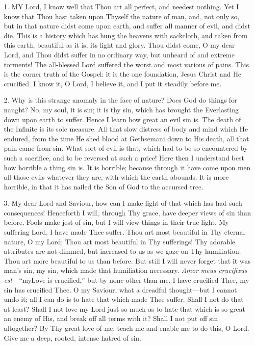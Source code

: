 
1. MY
Lord, I know well that Thou art all perfect, and needest nothing. Yet I
know that Thou hast taken upon Thyself the nature of man, and, not only
so, but in that nature didst come upon earth, and suffer all
manner of evil, and didst die. This is a history which has hung the
heavens with sackcloth, and taken from this earth, beautiful as it is,
its light and glory. Thou didst come, O my dear Lord, and Thou didst
suffer in no ordinary way, but unheard of and extreme torments! The
all-blessed Lord suffered the worst and most various of pains. This is
the corner truth of the Gospel: it is the one foundation, Jesus Christ
and He crucified. I know it, O Lord, I believe it, and I put it steadily
before me.

2. Why is this strange anomaly
in the face of nature? Does God do things for naught? No, my soul, it is
sin; it is thy sin, which has brought the Everlasting down upon earth to
suffer. Hence I learn how great an evil sin is. The death of the
Infinite is its sole measure. All that slow distress of body and mind
which He endured, from the time He shed blood at Gethsemani down to His
death, all that pain came from sin. What sort of evil is that, which had
to be so encountered by such a sacrifice, and to be reversed at such a
price! Here then I understand best how horrible a thing sin is. It is
horrible; because through it have come upon men all those evils whatever
they are, with which the earth abounds. It is more horrible, in that it
has nailed the Son of God to the accursed tree.

3. My dear Lord and Saviour, how
can I make light of that which has had such consequences! Henceforth I
will, through Thy grace, have deeper views of sin than before. Fools
make jest of sin, but I will view things in their true light. My
suffering Lord, I have made Thee suffer. Thou art most beautiful in Thy
eternal nature, O my Lord; Thou art most beautiful in Thy sufferings!
Thy adorable attributes are not dimmed, but increased to us as we gaze
on Thy humiliation. Thou art more beautiful to us than before. But still
I will never forget that it was man's sin, my sin, which made that
humiliation necessary. \emph{Amor meus crucifixus est}—``my\emph{}Love
is crucified,'' but by none other than me. I have crucified Thee, my sin
has crucified Thee. O my Saviour, what a dreadful thought—but I cannot
undo it; all I can do is to hate that which made Thee suffer. Shall I
not do that at least? Shall I not love my Lord just so much as to hate
that which is so great an enemy of His, and break off all terms with it?
Shall I not put off sin altogether? By Thy great love of me, teach me
and enable me to do this, O Lord. Give me a deep, rooted, intense hatred
of sin.

